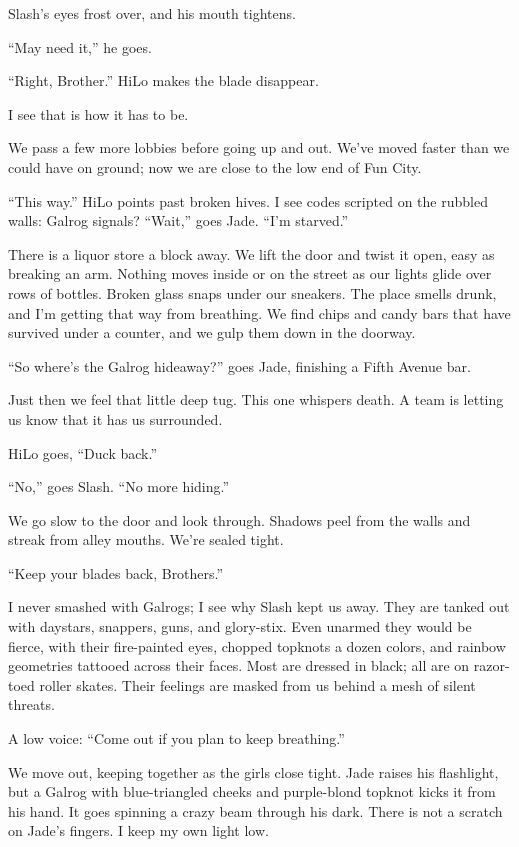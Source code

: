 Slash's eyes frost over, and his mouth tightens.

“May need it,” he goes.

“Right, Brother.” HiLo makes the blade disappear.

I see that is how it has to be.

We pass a few more lobbies before going up and out. We've moved faster than we could have on ground; now we are close to the low end of Fun City.

“This way.” HiLo points past broken hives. I see codes scripted on the rubbled walls: Galrog signals?
“Wait,” goes Jade. “I'm starved.”

There is a liquor store a block away. We lift the door and twist it open, easy as breaking an arm. Nothing moves inside or on the street as our lights glide over rows of bottles. Broken glass snaps under our sneakers. The place smells drunk, and I'm getting that way from breathing. We find chips and candy bars that have survived under a counter, and we gulp them down in the doorway.

“So where's the Galrog hideaway?” goes Jade, finishing a Fifth Avenue bar.

Just then we feel that little deep tug. This one whispers death. A team is letting us know that it has us surrounded.

HiLo goes, “Duck back.”

“No,” goes Slash. “No more hiding.”

We go slow to the door and look through. Shadows peel from the walls and streak from alley mouths. We're sealed tight.

“Keep your blades back, Brothers.”

I never smashed with Galrogs; I see why Slash kept us away. They are tanked out with daystars, snappers, guns, and glory-stix. Even unarmed they would be fierce, with their fire-painted eyes, chopped topknots a dozen colors, and rainbow geometries tattooed across their faces. Most are dressed in black; all are on razor-toed roller skates.
Their feelings are masked from us behind a mesh of silent threats.

A low voice: “Come out if you plan to keep breathing.”

We move out, keeping together as the girls close tight. Jade raises his flashlight, but a Galrog with blue-triangled cheeks and purple-blond topknot kicks it from his hand. It goes spinning a crazy beam through his dark. There is not a scratch on Jade's fingers. I keep my own light low.

